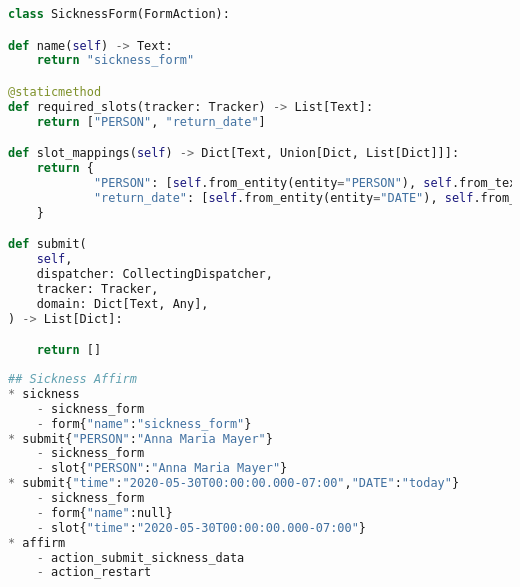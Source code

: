 \begin{lstlisting}[caption={Slot Filling Action}, label={lst:slot_fill_action},captionpos=b,frame=single,language={Python},commentstyle=\color{mygreen},keywordstyle=\color{blue},
    morekeywords={}]                
class SicknessForm(FormAction):

def name(self) -> Text:
    return "sickness_form"

@staticmethod
def required_slots(tracker: Tracker) -> List[Text]:
    return ["PERSON", "return_date"]

def slot_mappings(self) -> Dict[Text, Union[Dict, List[Dict]]]:
    return {
            "PERSON": [self.from_entity(entity="PERSON"), self.from_text()],
            "return_date": [self.from_entity(entity="DATE"), self.from_text()]
    }

def submit(
    self,
    dispatcher: CollectingDispatcher,
    tracker: Tracker,
    domain: Dict[Text, Any],
) -> List[Dict]:

    return []    
\end{lstlisting} 

\begin{lstlisting}[caption={Rasa Sickness Story}, label={lst:rasa_sickness_story},captionpos=b,frame=single,language={Python},commentstyle=\color{mygreen},keywordstyle=\color{blue},
    morekeywords={sickness, submit, affirm}]                
## Sickness Affirm
* sickness
    - sickness_form
    - form{"name":"sickness_form"}
* submit{"PERSON":"Anna Maria Mayer"}
    - sickness_form
    - slot{"PERSON":"Anna Maria Mayer"}
* submit{"time":"2020-05-30T00:00:00.000-07:00","DATE":"today"}
    - sickness_form
    - form{"name":null}
    - slot{"time":"2020-05-30T00:00:00.000-07:00"}
* affirm
    - action_submit_sickness_data
    - action_restart
\end{lstlisting} 

